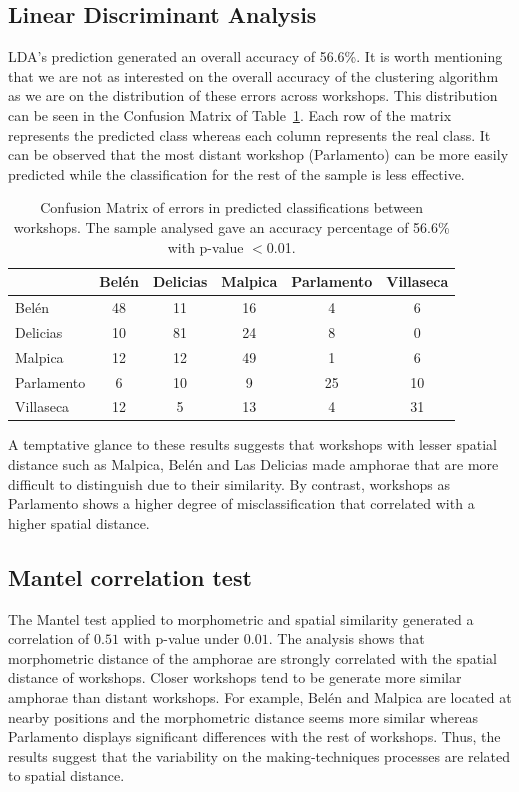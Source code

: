 \documentclass[review]{elsarticle}
\begin{document}
\subsection{Linear Discriminant Analysis}

LDA's prediction generated an overall accuracy of 56.6\%. It is worth mentioning that we are not as interested on the overall accuracy of the clustering algorithm as we are on the distribution of these errors across workshops. This distribution can be seen in the Confusion Matrix of Table~\ref{table:confusion}. Each row of the matrix represents the predicted class whereas each column represents the real class. It can be observed that the most distant workshop (Parlamento) can be more easily predicted while the classification for the rest of the sample is less effective.

\begin{table}[htp]
\begin{tabular}{lccccc}
\hline
      & Belén & Delicias & Malpica & Parlamento & Villaseca\\ \hline
Belén & 48 & 11 & 16 & 4 & 6 \\
Delicias & 10 & 81 & 24 & 8 & 0 \\
Malpica & 12 & 12 & 49 & 1 & 6 \\
Parlamento & 6 & 10 & 9 & 25 & 10 \\
Villaseca & 12 & 5 & 13 & 4 & 31 \\
\hline

\end{tabular}
\caption{Confusion Matrix of errors in predicted classifications between workshops. The sample analysed gave an accuracy percentage of 56.6\% with p-value $<$0.01. }
\label{table:confusion}
\end{table}

A temptative glance to these results suggests that workshops with lesser spatial distance such as Malpica, Belén and Las Delicias made amphorae that are more difficult to distinguish due to their similarity. By contrast, workshops as Parlamento shows a higher degree of misclassification that correlated with a higher spatial distance. 

\subsection{Mantel correlation test}

The Mantel test applied to morphometric and spatial similarity generated a correlation of $0.51$ with p-value under $0.01$. The analysis shows that morphometric distance of the amphorae are strongly correlated with the spatial distance of workshops. Closer workshops tend to be generate more similar amphorae than distant workshops. For example, Belén and Malpica are located at nearby positions and the morphometric distance seems more similar whereas Parlamento displays significant differences with the rest of workshops. Thus, the results suggest that the variability on the making-techniques processes are related to spatial distance.
\end{document}
